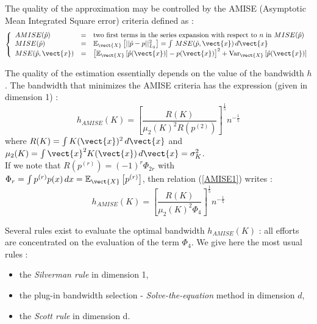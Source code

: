 {  The quality of the approximation may be controlled by the AMISE (Asymptotic Mean Integrated Square error) criteria defined as :
  \begin{align*}
    \left\{
    \begin{array}{lcl}
      AMISE(\hat{p}) & = & \mbox{two first terms in the series expansion with respect to $n$ in } MISE(\hat{p}) \\
      MISE(\hat{p}) & = & \mathbb{E}_\vect{X}\left[||\hat{p} - p||^2_{L_2}\right]   =  \int \, MSE(\hat{p}, \vect{x}) \, d\vect{x}  \\
      MSE(\hat{p}, \vect{x})&  =  & \left[ \mathbb{E}_\vect{X}\left[\hat{p}(\vect{x})\right] - p(\vect{x})\right]^2 + {\rm Var}_\vect{X}\left[\hat{p}(\vect{x})\right]
    \end{array}
    \right.
  \end{align*}


  The quality of the estimation essentially depends on the value of the bandwidth $h$. The bandwidth that minimizes the AMISE criteria  has the expression (given in dimension 1) :
  \begin{equation}
    \label{AMISE1}
    h_{AMISE}(K) = \displaystyle \left[ \frac{R(K)}{\mu_2(K)^2R(p^{(2)})}\right]^{\frac{1}{5}}n^{-\frac{1}{5}}
  \end{equation}
  where  $R(K) = \int K(\vect{x})^2\, d\vect{x}$ and $\mu_2(K) = \int \vect{x}^2K(\vect{x})\, d\vect{x} = \sigma_K^2$.\\
  If we note that $R(p^{(r)}) = (-1)^r\Phi_{2r}$ with $\Phi_r = \int p^{(r)}p(x)\, dx = \mathbb{E}_\vect{X}\left[p^{(r)}\right]$, then relation (\ref{AMISE1}) writes :
  \begin{equation}
    \label{AMISE}
    h_{AMISE}(K) = \displaystyle \left[ \frac{R(K)}{\mu_2(K)^2\Phi_4}\right]^{\frac{1}{5}}n^{-\frac{1}{5}}
  \end{equation}

  Several rules exist to  evaluate the optimal bandwidth $ h_{AMISE}(K)$ : all efforts are concentrated on the evaluation of the term $\Phi_4$. We give here the most usual rules :
  \begin{itemize}
  \item the \emph{Silverman rule} in dimension 1,
  \item the plug-in bandwidth selection - \emph{Solve-the-equation} method in dimension $d$,
  \item the \emph{Scott rule} in dimension d.
  \end{itemize}



}
